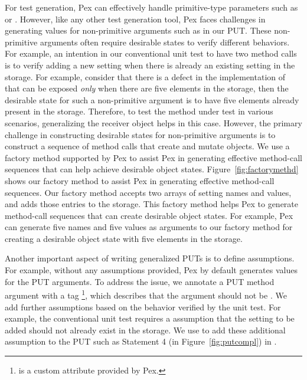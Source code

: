For test generation, Pex can effectively handle primitive-type parameters such
as  or . However, like any other test generation tool, Pex faces challenges 
in generating values for non-primitive arguments such as  in our PUT.
These non-primitive arguments often require desirable states to
verify different behaviors. For example, an intention in our conventional
unit test to have two  method calls is to verify
adding a new setting when there is already an existing setting in the
storage. For example, consider that there is a defect in the 
implementation of  that can be exposed \emph{only}
when there are five elements in the storage, then the desirable
state for such a non-primitive argument is to have five elements
already present in the storage. Therefore, to test the method under test in various scenarios, generalizing the receiver object helps in this case. However, the primary challenge in constructing 
desirable states for non-primitive arguments is to 
construct a sequence of method calls that create
and mutate objects. We use a factory method supported by Pex to assist Pex in generating effective method-call
sequences that can help achieve desirable object states. 
Figure~\ref{fig:factorymethd} shows our factory method to assist
Pex in generating effective method-call sequences.
Our factory method accepts two arrays of setting names and values,
and adds those entries to the storage. This factory method helps Pex
to generate method-call sequences that can create desirable object states.
For example, Pex can generate five names and five values as arguments
to our factory method for creating a desirable object state with
five elements in the storage.

Another important aspect of writing generalized PUTs is to 
define assumptions. For example, without any assumptions provided, Pex by default
generates  values for the PUT arguments. To address the issue, we annotate a PUT method argument with a tag \footnote{ is a custom attribute provided by Pex.}, which describes that the argument should not be . We add further assumptions
based on the behavior verified by the unit test. For example,
the conventional unit test requires a assumption that the setting
to be added should not already exist in the storage.
We use  to add these additional assumption to the PUT such as Statement 4 (in Figure~\ref{fig:putcompl}) in .

